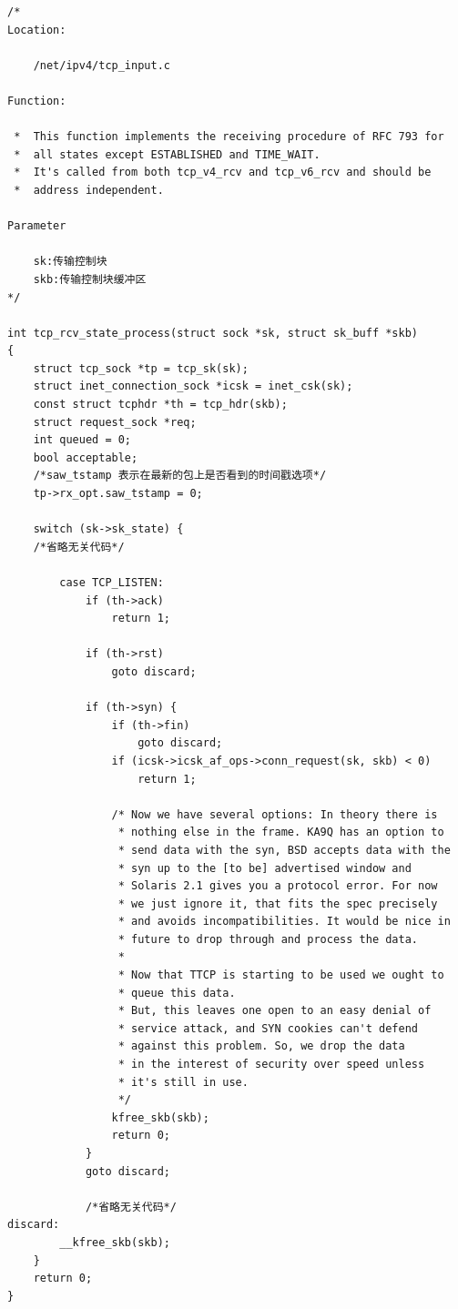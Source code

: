 \begin{verbatim}
/*
Location:
    
    /net/ipv4/tcp_input.c

Function:

 *  This function implements the receiving procedure of RFC 793 for
 *  all states except ESTABLISHED and TIME_WAIT.
 *  It's called from both tcp_v4_rcv and tcp_v6_rcv and should be
 *  address independent.    

Parameter

    sk:传输控制块
    skb:传输控制块缓冲区
*/

int tcp_rcv_state_process(struct sock *sk, struct sk_buff *skb)
{
    struct tcp_sock *tp = tcp_sk(sk);
    struct inet_connection_sock *icsk = inet_csk(sk);
    const struct tcphdr *th = tcp_hdr(skb);
    struct request_sock *req;
    int queued = 0;
    bool acceptable;
    /*saw_tstamp 表示在最新的包上是否看到的时间戳选项*/
    tp->rx_opt.saw_tstamp = 0;  

    switch (sk->sk_state) {
    /*省略无关代码*/

        case TCP_LISTEN:
            if (th->ack)
                return 1;

            if (th->rst)
                goto discard;

            if (th->syn) {
                if (th->fin)
                    goto discard;
                if (icsk->icsk_af_ops->conn_request(sk, skb) < 0)
                    return 1;

                /* Now we have several options: In theory there is
                 * nothing else in the frame. KA9Q has an option to
                 * send data with the syn, BSD accepts data with the
                 * syn up to the [to be] advertised window and
                 * Solaris 2.1 gives you a protocol error. For now
                 * we just ignore it, that fits the spec precisely
                 * and avoids incompatibilities. It would be nice in
                 * future to drop through and process the data.
                 *
                 * Now that TTCP is starting to be used we ought to
                 * queue this data.
                 * But, this leaves one open to an easy denial of
                 * service attack, and SYN cookies can't defend
                 * against this problem. So, we drop the data
                 * in the interest of security over speed unless
                 * it's still in use.
                 */
                kfree_skb(skb);
                return 0;
            }
            goto discard;

            /*省略无关代码*/
discard:
        __kfree_skb(skb);
    }
    return 0;
}
\end{verbatim}

